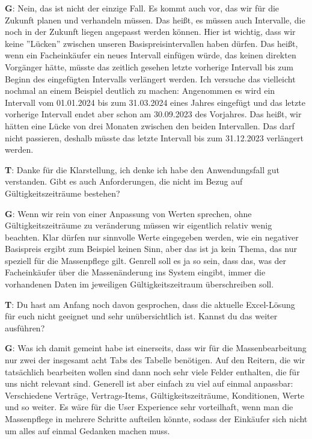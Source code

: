 \begin{list}{X:}{\setlength{\labelsep}{5mm}}
 \item[\textbf{G}:] Nein, das ist nicht der einzige Fall. Es kommt auch vor, das wir für die Zukunft planen und verhandeln müssen. Das hei\ss t, es müssen auch Intervalle, die noch in der Zukunft liegen angepasst werden können. Hier ist wichtig, dass wir keine ''Lücken'' zwischen unseren Basispreisintervallen haben dürfen. Das hei\ss t, wenn ein Facheinkäufer ein neues Intervall einfügen würde, das keinen direkten Vorgänger hätte, müsste das zeitlich gesehen letzte vorherige Intervall bis zum Beginn des eingefügten Intervalls verlängert werden. Ich versuche das vielleicht nochmal an einem Beispiel deutlich zu machen: Angenommen es wird ein Intervall vom 01.01.2024 bis zum 31.03.2024 eines Jahres eingefügt und das letzte vorherige Intervall endet aber schon am 30.09.2023 des Vorjahres. Das hei\ss t, wir hätten eine Lücke von drei Monaten zwischen den beiden Intervallen. Das darf nicht passieren, deshalb müsste das letzte Intervall bis zum 31.12.2023 verlängert werden.
 \item[\textbf{T}:] Danke für die Klarstellung, ich denke ich habe den Anwendungsfall gut verstanden. Gibt es auch Anforderungen, die nicht im Bezug auf Gültigkeitszeiträume bestehen?
 \item[\textbf{G}:] Wenn wir rein von einer Anpassung von Werten sprechen, ohne Gültigkeitszeiträume zu veränderung müssen wir eigentlich relativ wenig beachten. Klar dürfen nur sinnvolle Werte eingegeben werden, wie \zB ein negativer Basispreis ergibt zum Beispiel keinen Sinn, aber das ist ja kein Thema, das nur speziell für die Massenpflege gilt. Genrell soll es ja so sein, dass das, was der Facheinkäufer über die Massenänderung ins System eingibt, immer die vorhandenen Daten im jeweiligen Gültigkeitszeitraum überschreiben soll.
 \item[\textbf{T}:] Du hast am Anfang noch davon gesprochen, dass die aktuelle Excel-Lösung für euch nicht geeignet und sehr unübersichtlich ist. Kannst du das weiter ausführen?
 \item[\textbf{G}:] Was ich damit gemeint habe ist einerseits, dass wir für die Massenbearbeitung nur zwei der insgesamt acht Tabs des Tabelle benötigen. Auf den Reitern, die wir tatsächlich bearbeiten wollen sind dann noch sehr viele Felder enthalten, die für uns nicht relevant sind. Generell ist aber einfach zu viel auf einmal anpassbar: Verschiedene Verträge, Vertrags-Items, Gültigkeitszeiträume, Konditionen, Werte und so weiter. Es wäre für die User Experience sehr vorteilhaft, wenn man die Massenpflege in mehrere Schritte aufteilen könnte, sodass der Einkäufer sich nicht um alles auf einmal Gedanken machen muss. 

\end{list}
